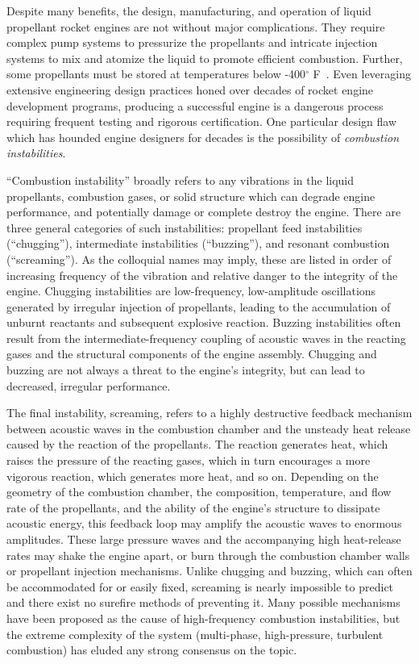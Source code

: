 Despite many benefits, the design, manufacturing, and operation of liquid propellant rocket engines are not without major complications. They require complex pump systems to pressurize the propellants and intricate injection systems to mix and atomize the liquid to promote efficient combustion. Further, some propellants must be stored at temperatures below \mbox{-400$^{\circ}$} F~\cite{liquidHydrogenProps}. Even leveraging extensive engineering design practices honed over decades of rocket engine development programs, producing a successful engine is a dangerous process requiring frequent testing and rigorous certification. One particular design flaw which has hounded engine designers for decades is the possibility of \textit{combustion instabilities}.

``Combustion instability'' broadly refers to any vibrations in the liquid propellants, combustion gases, or solid structure which can degrade engine performance, and potentially damage or complete destroy the engine. There are three general categories of such instabilities: propellant feed instabilities (``chugging''), intermediate instabilities (``buzzing''), and resonant combustion (``screaming''). As the colloquial names may imply, these are listed in order of increasing frequency of the vibration and relative danger to the integrity of the engine. Chugging instabilities are low-frequency, low-amplitude oscillations generated by irregular injection of propellants, leading to the accumulation of unburnt reactants and subsequent explosive reaction. Buzzing instabilities often result from the intermediate-frequency coupling of acoustic waves in the reacting gases and the structural components of the engine assembly. Chugging and buzzing are not always a threat to the engine's integrity, but can lead to decreased, irregular performance.

The final instability, screaming, refers to a highly destructive feedback mechanism between acoustic waves in the combustion chamber and the unsteady heat release caused by the reaction of the propellants. The reaction generates heat, which raises the pressure of the reacting gases, which in turn encourages a more vigorous reaction, which generates more heat, and so on. Depending on the geometry of the combustion chamber, the composition, temperature, and flow rate of the propellants, and the ability of the engine's structure to dissipate acoustic energy, this feedback loop may amplify the acoustic waves to enormous amplitudes. These large pressure waves and the accompanying high heat-release rates may shake the engine apart, or burn through the combustion chamber walls or propellant injection mechanisms. Unlike chugging and buzzing, which can often be accommodated for or easily fixed, screaming is nearly impossible to predict and there exist no surefire methods of preventing it. Many possible mechanisms have been proposed as the cause of high-frequency combustion instabilities, but the extreme complexity of the system (multi-phase, high-pressure, turbulent combustion) has eluded any strong consensus on the topic.

